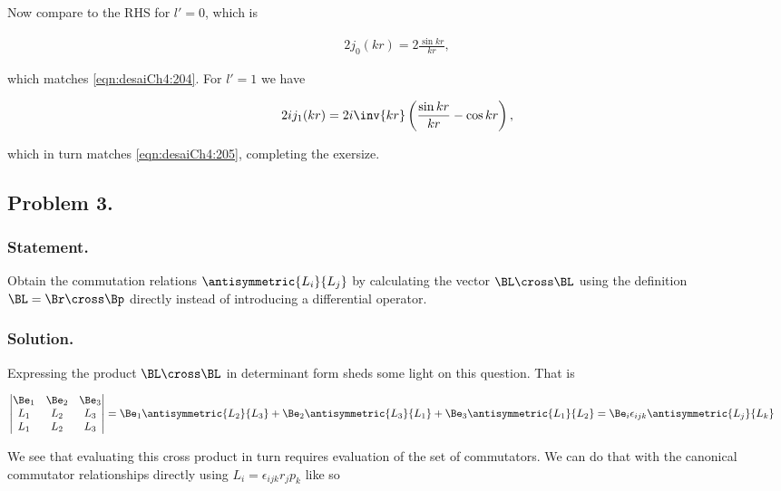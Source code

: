 Now compare to the RHS for $l'=0$, which is

\begin{align}\label{eqn:desaiCh4:206}
2 j_0(kr) = 2 \frac{\sin{kr}}{kr},
\end{align}

which matches \ref{eqn:desaiCh4:204}.  For $l'=1$ we have

\begin{align}\label{eqn:desaiCh4:207}
2 i j_1(kr) = 2i \inv{kr} \left( \frac{\sin{kr}}{kr} - \cos{kr} \right),
\end{align}

which in turn matches \ref{eqn:desaiCh4:205}, completing the exersize.

\subsection{Problem 3.}
\subsubsection{Statement.}

Obtain the commutation relations $\antisymmetric{L_i}{L_j}$ by calculating the vector $\BL \cross \BL$ using the definition $\BL = \Br \cross \Bp$ directly instead of introducing a differential operator.

\subsubsection{Solution.}

Expressing the product $\BL \cross \BL$ in determinant form sheds some light on this question.  That is

\begin{align}\label{eqn:desaiCh4:300}
\begin{vmatrix}
 \Be_1 & \Be_2 & \Be_3 \\
 L_1 & L_2 & L_3 \\
 L_1 & L_2 & L_3
\end{vmatrix}
&=
 \Be_1 \antisymmetric{L_2}{L_3}
 +\Be_2 \antisymmetric{L_3}{L_1}
 +\Be_3 \antisymmetric{L_1}{L_2}
= \Be_i \epsilon_{ijk} \antisymmetric{L_j}{L_k}
\end{align}

We see that evaluating this cross product in turn requires evaluation of the set of commutators.  We can do that with the canonical commutator relationships directly using $L_i = \epsilon_{ijk} r_j p_k$ like so

